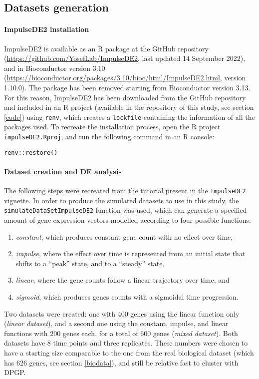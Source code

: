 \subsection{Datasets generation}\label{simulation}
\paragraph{ImpulseDE2 installation} ImpulseDE2 is available as an R package at the GitHub repository (\url{https://github.com/YosefLab/ImpulseDE2}, last updated 14 September 2022), and in Bioconductor version 3.10 (\url{https://bioconductor.org/packages/3.10/bioc/html/ImpulseDE2.html}, version 1.10.0). The package has been removed starting from Bioconductor version 3.13.
For this reason, ImpulseDE2 has been downloaded from the GitHub repository and included in an R project (available in the repository of this study, see section \ref{code}) using \texttt{renv}, which creates a \texttt{lockfile} containing the information of all the packages used. To recreate the installation process, open the R project \texttt{impulseDE2.Rproj}, and run the following command in an R console:
\begin{verbatim}
renv::restore()
\end{verbatim}

\paragraph{Dataset creation and DE analysis} The following steps were recreated from the tutorial present in the \texttt{ImpulseDE2} vignette. In order to produce the simulated datasets to use in this study, the \texttt{simulateDataSetImpulseDE2} function was used, which can generate a specified amount of gene expression vectors modelled according to four possible functions:
\begin{enumerate}
    \item \emph{constant}, which produces constant gene count with no effect over time,
    \item \emph{impulse}, where the effect over time is represented from an initial state that shifts to a ``peak'' state, and to a ``steady'' state,
    \item \emph{linear}, where the gene counts follow a linear trajectory over time, and
    \item \emph{sigmoid}, which produces genes counts with a sigmoidal time progression.
\end{enumerate}

Two datasets were created: one with \num{400} genes using the linear function only (\emph{linear dataset}), and a second one using the constant, impulse, and linear functions with \num{200} genes each, for a total of \num{600} genes (\emph{mixed dataset}). Both datasets have 8 time points and three replicates. These numbers were chosen to have a starting size comparable to the one from the real biological dataset (which has 626 genes, see section \ref{biodata}), and still be relative fast to cluster with DPGP.

